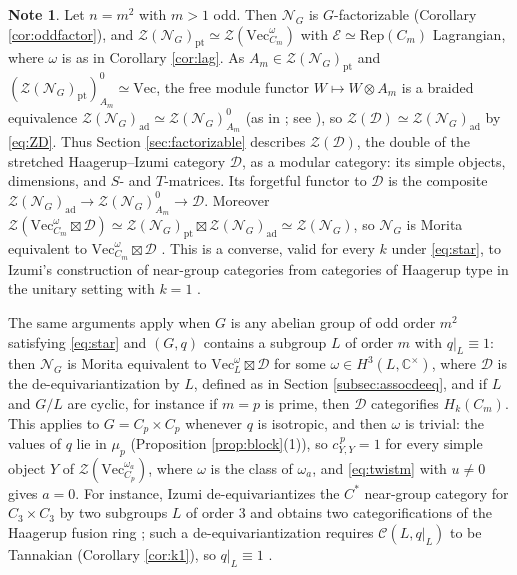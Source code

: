 \documentclass[10pt]{article}
\theoremstyle{plain}
\theoremstyle{definition}
\newtheorem{note}[theorem]{Note}
\theoremstyle{plain}
\begin{document}
\begin{note}\label{rem:morita}
Let $n=m^2$ with $m>1$ odd. Then $\mathcal{N}_G$ is $G$-factorizable (Corollary \ref{cor:oddfactor}), and $\mathcal{Z}(\mathcal{N}_G)_\mathrm{pt}\simeq\mathcal{Z}(\mathrm{Vec}^\omega_{C_m})$ with $\mathcal{E}\simeq\mathrm{Rep}(C_m)$ Lagrangian, where $\omega$ is as in Corollary \ref{cor:lag}. As $A_m\in\mathcal{Z}(\mathcal{N}_G)_\mathrm{pt}$ and $(\mathcal{Z}(\mathcal{N}_G)_\mathrm{pt})^0_{A_m}\simeq\mathrm{Vec}$, the free module functor $W\mapsto W\otimes A_m$ is a braided equivalence $\mathcal{Z}(\mathcal{N}_G)_\mathrm{ad}\simeq\mathcal{Z}(\mathcal{N}_G)^0_{A_m}$ (as in \cite[Lemma 3.29]{MR3039775}; see \cite[Remark 4.7]{MR3039775}), so $\mathcal{Z}(\mathcal{D})\simeq\mathcal{Z}(\mathcal{N}_G)_\mathrm{ad}$ by \eqref{eq:ZD}. Thus Section \ref{sec:factorizable} describes $\mathcal{Z}(\mathcal{D})$, the double of the stretched Haagerup--Izumi category $\mathcal{D}$, as a modular category: its simple objects, dimensions, and $S$- and $T$-matrices. Its forgetful functor to $\mathcal{D}$ is the composite $\mathcal{Z}(\mathcal{N}_G)_\mathrm{ad}\to\mathcal{Z}(\mathcal{N}_G)^0_{A_m}\to\mathcal{D}$. Moreover $\mathcal{Z}(\mathrm{Vec}^\omega_{C_m}\boxtimes\mathcal{D})\simeq\mathcal{Z}(\mathcal{N}_G)_\mathrm{pt}\boxtimes\mathcal{Z}(\mathcal{N}_G)_\mathrm{ad}\simeq\mathcal{Z}(\mathcal{N}_G)$, so $\mathcal{N}_G$ is Morita equivalent to $\mathrm{Vec}^\omega_{C_m}\boxtimes\mathcal{D}$ \cite[Theorem 3.1]{MR2735754}. This is a converse, valid for every $k$ under \eqref{eq:star}, to Izumi's construction of near-group categories from categories of Haagerup type in the unitary setting with $k=1$ \cite[Theorem 12.9 and Remark 12.10]{MR3635673}.

The same arguments apply when $G$ is any abelian group of odd order $m^2$ satisfying \eqref{eq:star} and $(G,q)$ contains a subgroup $L$ of order $m$ with $q|_L\equiv1$: then $\mathcal{N}_G$ is Morita equivalent to $\mathrm{Vec}^{\omega}_{L}\boxtimes\mathcal{D}$ for some $\omega\in H^3(L,\mathbb{C}^\times)$, where $\mathcal{D}$ is the de-equivariantization by $L$, defined as in Section \ref{subsec:assocdeeq}, and if $L$ and $G/L$ are cyclic, for instance if $m=p$ is prime, then $\mathcal{D}$ categorifies $H_k(C_m)$. This applies to $G=C_p\times C_p$ whenever $q$ is isotropic, and then $\omega$ is trivial: the values of $q$ lie in $\mu_p$ (Proposition \ref{prop:block}(1)), so $c_{Y,Y}^{\,p}=1$ for every simple object $Y$ of $\mathcal{Z}(\mathrm{Vec}^{\omega_a}_{C_p})$, where $\omega$ is the class of $\omega_a$, and \eqref{eq:twistm} with $u\neq0$ gives $a=0$. For instance, Izumi de-equivariantizes the $C^\ast$ near-group category for $C_3\times C_3$ by two subgroups $L$ of order $3$ and obtains two categorifications of the Haagerup fusion ring \cite[Example 12.13]{MR3635673}; such a de-equivariantization requires $\mathcal{C}(L,q|_L)$ to be Tannakian (Corollary \ref{cor:k1}), so $q|_L\equiv1$ \cite[Example 2.48]{MR2609644}.
\end{note}
\end{document}
